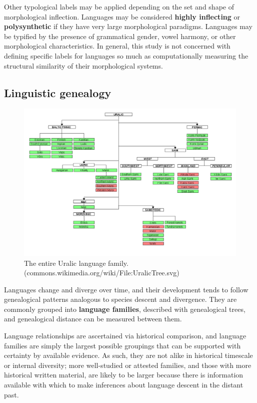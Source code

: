 Other typological labels may be applied depending on the set and shape of morphological inflection. Languages may be considered \textbf{highly inflecting} or \textbf{polysynthetic} if they have very large morphological paradigms. Languages may be typified by the presence of grammatical gender, vowel harmony, or other morphological characteristics. In general, this study is not concerned with defining specific labels for languages so much as computationally measuring the structural similarity of their morphological systems.

\subsection{Linguistic genealogy}

\begin{figure}[hp]
\includegraphics[width=13cm]{images/1280px-UralicTree.png}
\centering
\caption{The entire Uralic language family. \\ (commons.wikimedia.org/wiki/File:UralicTree.svg)}
\end{figure}

Languages change and diverge over time, and their development tends to follow genealogical patterns analogous to species descent and divergence. They are commonly grouped into \textbf{language families}, described with genealogical trees, and genealogical distance can be measured between them.

Language relationships are ascertained via historical comparison, and language families are simply the largest possible groupings that can be supported with certainty by available evidence. As such, they are not alike in historical timescale or internal diversity; more well-studied or attested families, and those with more historical written material, are likely to be larger because there is information available with which to make inferences about language descent in the distant past.

